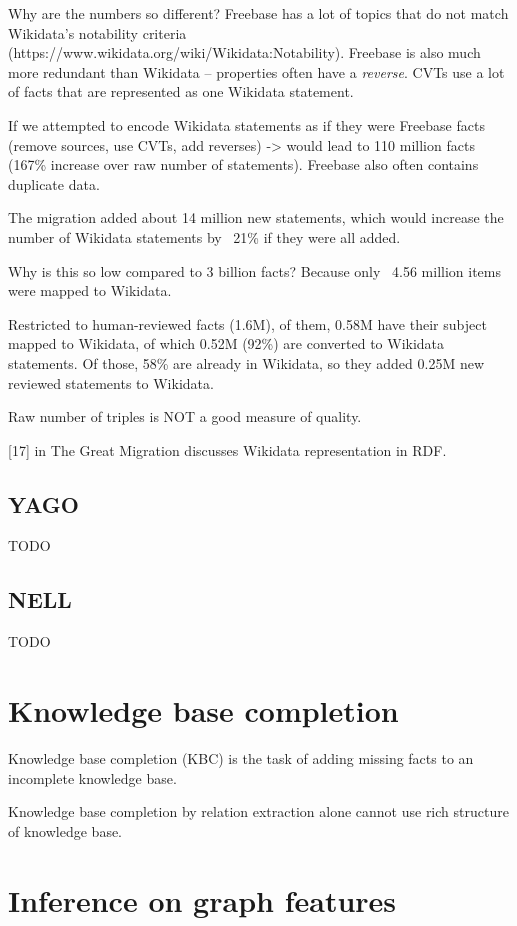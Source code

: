 Why are the numbers so different? Freebase has a lot of topics that do not match
Wikidata's notability criteria (https://www.wikidata.org/wiki/Wikidata:Notability).
Freebase is also much more redundant than Wikidata -- properties often have a
\textit{reverse}.
CVTs use a lot of facts that are represented as one Wikidata statement.

If we attempted to encode Wikidata statements as if they were Freebase facts
(remove sources, use CVTs, add reverses) -> would lead to 110 million facts
(167\% increase over raw number of statements).
Freebase also often contains duplicate data.

The migration added about 14 million new statements, which would increase the
number of Wikidata statements by ~21\% if they were all added.

Why is this so low compared to 3 billion facts? Because only ~4.56 million items
were mapped to Wikidata.

Restricted to human-reviewed facts (1.6M), of them, 0.58M have their subject
mapped to Wikidata, of which 0.52M (92\%) are converted to Wikidata statements.
Of those, 58\% are already in Wikidata, so they added 0.25M new reviewed
statements to Wikidata.

Raw number of triples is NOT a good measure of quality.

[17] in The Great Migration discusses Wikidata representation in RDF.

\subsection{YAGO}

TODO

\subsection{NELL}

TODO

\section{Knowledge base completion}

Knowledge base completion (KBC) is the task of adding missing facts to an
incomplete knowledge base.

Knowledge base completion by relation extraction alone cannot use rich structure
of knowledge base.

\section{Inference on graph features}

